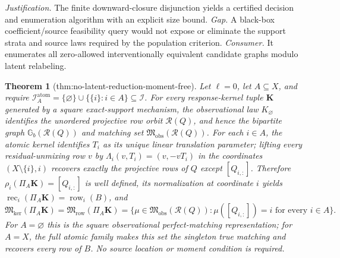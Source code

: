 \documentclass{article}
\newtheorem{theorem}{Theorem}
\begin{document}
\par\smallskip\noindent \textit{Justification.} The finite downward-closure disjunction yields a certified decision and enumeration algorithm with an explicit size bound. \textit{Gap.} A black-box coefficient/source feasibility query would not expose or eliminate the support strata and source laws required by the population criterion. \textit{Consumer.} It enumerates all zero-allowed interventionally equivalent candidate graphs modulo latent relabeling.

\begin{theorem}[thm:no-latent-reduction-moment-free]\label{thm:no-latent-reduction-moment-free}
Let \(\ell=0\), let \(A\subseteq X\), and require \(\mathcal I_A^{\mathrm{atom}}=\{\varnothing\}\cup\{\{i\}:i\in A\}\subseteq\mathcal I\). For every response-kernel tuple \(\mathbf K\) generated by a square exact-support mechanism, the observational law \(K_{\varnothing}\) identifies the unordered projective row orbit \(\mathscr R(Q)\), and hence the bipartite graph \(\mathbb G_b(\mathscr R(Q))\) and matching set \(\mathfrak M_{\mathrm{obs}}(\mathscr R(Q))\). For each \(i\in A\), the atomic kernel identifies \(T_i\) as its unique linear translation parameter; lifting every residual-unmixing row \(v\) by \(\Lambda_i(v,T_i)=(v,-vT_i)\) in the coordinates \((X\setminus\{i\},i)\) recovers exactly the projective rows of \(Q\) except \([Q_{i,:}]\). Therefore \(\rho_i(\Pi_A\mathbf K)=[Q_{i,:}]\) is well defined, its normalization at coordinate \(i\) yields \(\operatorname{rec}_i(\Pi_A\mathbf K)=\operatorname{row}_i(B)\), and
\[
\mathfrak M_{\mathrm{ker}}(\Pi_A\mathbf K)=\mathfrak M_{\mathrm{row}}(\Pi_A\mathbf K)=\{\mu\in\mathfrak M_{\mathrm{obs}}(\mathscr R(Q)):\mu([Q_{i,:}])=i\text{ for every }i\in A\}.
\]
For \(A=\varnothing\) this is the square observational perfect-matching representation; for \(A=X\), the full atomic family makes this set the singleton true matching and recovers every row of \(B\). No source location or moment condition is required.
\end{theorem}
\end{document}
